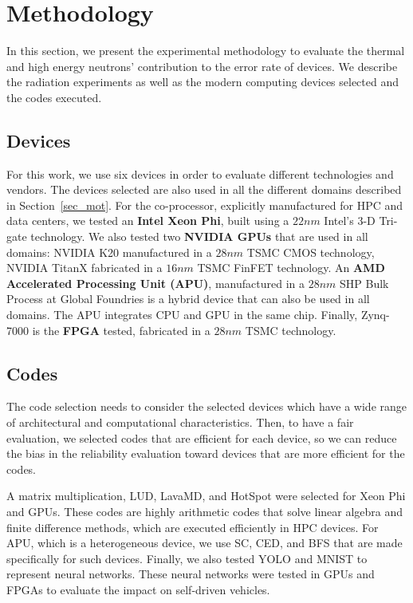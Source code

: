 \section{Methodology}
\label{sec_methodology}

In this section, we present the experimental methodology to evaluate the thermal and high energy neutrons' contribution to the error rate of devices.
We describe the radiation experiments as well as the modern computing devices selected and the codes executed.

\subsection{Devices}
\label{subsec_devices}

For this work, we use six devices in order to evaluate different technologies and vendors. The devices selected are also used in all the different domains described in Section~\ref{sec_mot}. For the co-processor, explicitly manufactured for HPC and data centers, we tested an \textbf{Intel Xeon Phi}, built using a $22nm$ Intel's 3-D Tri-gate technology. We also tested two \textbf{NVIDIA GPUs} that are used in all domains: NVIDIA K20 manufactured in a $28nm$ TSMC CMOS technology, NVIDIA TitanX fabricated in a $16nm$ TSMC FinFET technology. An \textbf{AMD Accelerated Processing Unit (APU)}, manufactured in a $28nm$ SHP Bulk Process at Global Foundries is a hybrid device that can also be used in all domains. The APU integrates CPU and GPU in the same chip. Finally, Zynq-7000 is the \textbf{FPGA} tested, fabricated in a $28nm$ TSMC technology.

\subsection{Codes}
\label{subsec_codes}

The code selection needs to consider the selected devices which have a wide range of architectural and computational characteristics. Then, to have a fair evaluation, we selected codes that are efficient for each device, so we can reduce the bias in the reliability evaluation toward devices that are more efficient for the codes.

A matrix multiplication, LUD, LavaMD, and HotSpot were selected for Xeon Phi and GPUs. These codes are highly arithmetic codes that solve linear algebra and finite difference methods, which are executed efficiently in HPC devices. For APU, which is a heterogeneous device, we use SC, CED, and BFS that are made specifically for such devices. Finally, we also tested YOLO and MNIST to represent neural networks. These neural networks were tested in GPUs and FPGAs to evaluate the impact on self-driven vehicles.


